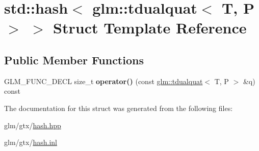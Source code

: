 \hypertarget{structstd_1_1hash_3_01glm_1_1tdualquat_3_01T_00_01P_01_4_01_4}{\section{std\-:\-:hash$<$ glm\-:\-:tdualquat$<$ T, P $>$ $>$ Struct Template Reference}
\label{structstd_1_1hash_3_01glm_1_1tdualquat_3_01T_00_01P_01_4_01_4}
}
\subsection*{Public Member Functions}
\begin{DoxyCompactItemize}
\item 
\hypertarget{structstd_1_1hash_3_01glm_1_1tdualquat_3_01T_00_01P_01_4_01_4_a70f65c8dbe2b015233f9b1a65f8fdb56}{G\-L\-M\-\_\-\-F\-U\-N\-C\-\_\-\-D\-E\-C\-L size\-\_\-t {\bfseries operator()} (const \hyperlink{structglm_1_1tdualquat}{glm\-::tdualquat}$<$ T, P $>$ \&q) const }\label{structstd_1_1hash_3_01glm_1_1tdualquat_3_01T_00_01P_01_4_01_4_a70f65c8dbe2b015233f9b1a65f8fdb56}

\end{DoxyCompactItemize}


The documentation for this struct was generated from the following files\-:\begin{DoxyCompactItemize}
\item 
glm/gtx/\hyperlink{hash_8hpp}{hash.\-hpp}\item 
glm/gtx/\hyperlink{hash_8inl}{hash.\-inl}\end{DoxyCompactItemize}
